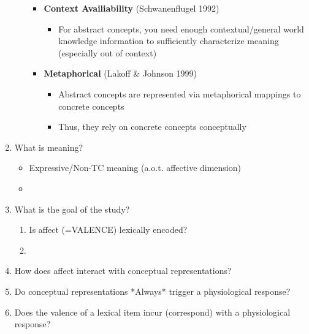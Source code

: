\documentclass[12pt,letterpaper,table,svgnames,dvipsnames]{article}
\begin{document}
\begin{enumerate}[noitemsep]
\begin{enumerate}[noitemsep]
\begin{itemize}
                        \item \textbf{Context Availiability} (Schwanenflugel 1992)
                            \begin{itemize}
                                \item For abstract concepts, you need enough contextual/general world knowledge information to sufficiently characterize meaning (especially out of context)
                            \end{itemize}
                        \item \textbf{Metaphorical} (Lakoff \& Johnson 1999)
                            \begin{itemize}
                                \item Abstract concepts are represented via metaphorical mappings to concrete concepts
                                \item Thus, they rely on concrete concepts conceptually
                            \end{itemize}
                    \end{itemize}
            \end{enumerate}    
            
            \item What is meaning?
                \begin{itemize}[noitemsep]
                    \item Expressive/Non-TC meaning (a.o.t. affective dimension)
                    \item 
                \end{itemize}
                
            \item What is the goal of the study?
                \begin{enumerate}[noitemsep]
                    \item Is affect (=VALENCE) lexically encoded?
                    \item 
                \end{enumerate}
           
            
            
            \item How does affect interact with conceptual representations?
            \item Do conceptual representations *Always* trigger a physiological response?
            \item Does the valence of a lexical item incur (correspond) with a physiological response?


            
        \end{enumerate}
\end{document}
